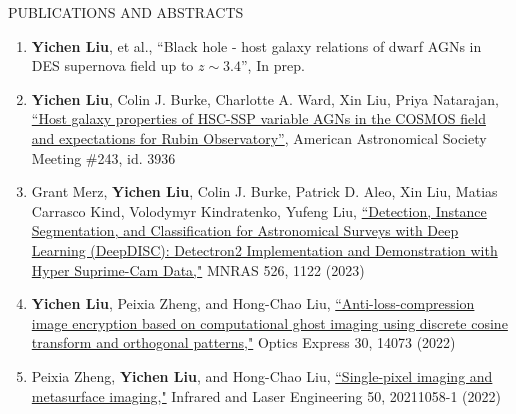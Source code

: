 \documentclass[10pt]{article} %
\DeclareRobustCommand{\yichen}[1]{#1}
\begin{document}
\begin{section}{PUBLICATIONS AND ABSTRACTS}
    
\begin{enumerate}[leftmargin=1.5em]
    \item \yichen{\textbf{Yichen Liu}, et al., ``Black hole - host galaxy relations of dwarf AGNs in DES supernova field up to $z\sim3.4$'', In prep.}
    \item \textbf{Yichen Liu}, Colin J. Burke, Charlotte A. Ward, Xin Liu, Priya Natarajan, \href{https://submissions.mirasmart.com/AAS243/Itinerary/PresentationDetail.aspx?evdid=500}{``Host galaxy properties of HSC-SSP variable AGNs in the COSMOS field and expectations for Rubin Observatory''}, American Astronomical Society Meeting \#243, id. 3936
    \item Grant Merz, \textbf{Yichen Liu}, Colin J. Burke, Patrick D. Aleo, Xin Liu, Matias Carrasco Kind, Volodymyr Kindratenko, Yufeng Liu, \href{https://academic.oup.com/mnras/advance-article-abstract/doi/10.1093/mnras/stad2785/7273850?redirectedFrom=fulltext}{``Detection, Instance Segmentation, and Classification for Astronomical Surveys with Deep Learning (DeepDISC): Detectron2 Implementation and Demonstration with Hyper Suprime-Cam Data,"} MNRAS 526, 1122 (2023)
    \item \textbf{Yichen Liu}, Peixia Zheng, and Hong-Chao Liu, \href{https://opg.optica.org/oe/fulltext.cfm?uri=oe-30-9-14073&id=471300}{``Anti-loss-compression image encryption based on computational ghost imaging using discrete cosine transform and orthogonal patterns,"} Optics Express 30, 14073 (2022)
    \item Peixia Zheng, \textbf{Yichen Liu}, and Hong-Chao Liu, \href{http://www.irla.cn/cn/article/doi/10.3788/IRLA20211058}{``Single-pixel imaging and metasurface imaging,"} Infrared and Laser Engineering 50, 20211058-1 (2022)
\end{enumerate}

\end{section}
\end{document}
